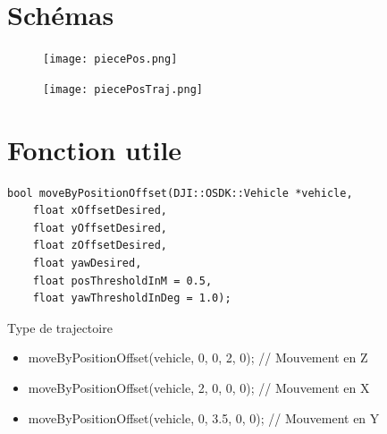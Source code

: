 \documentclass[12pt]{beamer}
\begin{document}
	\section{Schémas}
	\begin{frame}
    	    \begin{figure}
			    \centering
			    \texttt{[image: piecePos.png]}
			\end{figure}
	\end{frame}
	\begin{frame}
    	    \begin{figure}
			    \centering
			    \texttt{[image: piecePosTraj.png]}
			\end{figure}
	\end{frame}
	\section{Fonction utile}
	\begin{frame}[fragile]
        \begin{lstlisting}
bool moveByPositionOffset(DJI::OSDK::Vehicle *vehicle,
    float xOffsetDesired,
    float yOffsetDesired,
    float zOffsetDesired,
    float yawDesired,
    float posThresholdInM = 0.5,
    float yawThresholdInDeg = 1.0);\end{lstlisting}
        
        \begin{exampleblock}{Type de trajectoire}
            \begin{itemize}
                \item moveByPositionOffset(vehicle, 0, 0, 2, 0); // Mouvement en Z
                \item moveByPositionOffset(vehicle, 2, 0, 0, 0); // Mouvement en X
                \item moveByPositionOffset(vehicle, 0, 3.5, 0, 0); // Mouvement en Y
            \end{itemize}
        \end{exampleblock}
	\end{frame}
\end{document}
